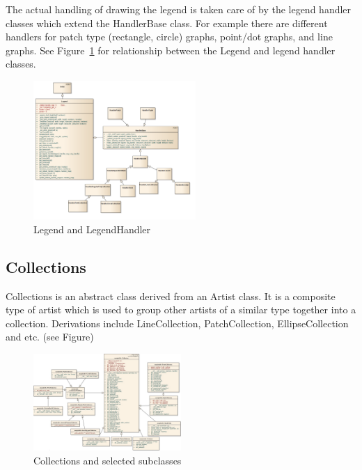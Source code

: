 \documentclass[pdftex,10pt,a4paper]{report}
\begin{document}
The actual handling of drawing the legend is taken care of by the legend handler classes which extend the HandlerBase class. For example there are different handlers for patch type (rectangle, circle) graphs, point/dot graphs, and line graphs.
See Figure~\ref{fig:legend}  for relationship between the Legend and legend handler classes.
\begin{figure}[ht!]
        \centering
                \includegraphics[width=0.55\textwidth]{img/umls/andrew/legend}
        \caption{Legend and LegendHandler}\label{fig:legend}
\end{figure}


\subsection{Collections}

Collections is an abstract class derived from an Artist class. It is a composite type of artist which is used to group other artists of a similar type together into a collection. Derivations include LineCollection, PatchCollection, EllipseCollection and etc. (see Figure)

\begin{figure}[ht!]
        \centering
                \includegraphics[width=0.5\textwidth]{img/umls/pi/collections}
        \caption{Collections and selected subclasses}\label{fig:artistExAgg}
\end{figure}
\end{document}
